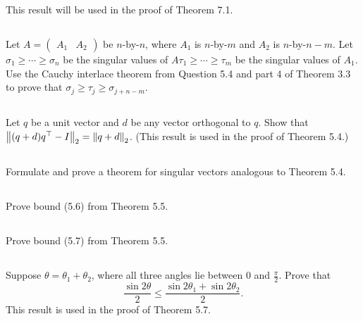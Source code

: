 \documentclass[a4paper]{ctexart}
\newcommand{\pf}{\textbf{\color{pink}{proof:}}}
\newcommand{\bymn}[2]{$#1$-by-$#2$}
\newcommand{\tmat}[2]{\begin{pmatrix}#1&#2\end{pmatrix}}
\begin{document}
This result will be used in the proof of Theorem 7.1.

\pf

\subsection{}
Let $A = \tmat{A_1}{A_2}$ be \bymn{n}{n}, where $A_1$ is \bymn{n}{m}
and $A_2$ is \bymn{n}{n-m}. Let $\sigma_1\ge\cdots\ge\sigma_n$ be the singular values of $A
\tau_1 \ge \cdots\ge \tau_m$ be the singular values of $A_1$. Use the Cauchy interlace theorem
from Question 5.4 and part 4 of Theorem 3.3 to prove that $\sigma_j \ge \tau_j \ge \sigma_{j+n-m}$.

\pf

\subsection{}
Let $q$ be a unit vector and $d$ be any vector orthogonal to $q$. 
Show that $\norm{(q + d)q^\top - I}_2 = \norm{q + d}_2$. (This result is used in the
proof of Theorem 5.4.)

\pf

\subsection{}
Formulate and prove a theorem for singular vectors
analogous to Theorem 5.4.

\pf

\subsection{}
Prove bound (5.6) from Theorem 5.5.

\pf

\subsection{}
Prove bound (5.7) from Theorem 5.5.

\pf

\subsection{}
Suppose $\theta = \theta_1 +\theta_2$, where all three angles lie between
$0$ and $\frac{\pi}{2}$. Prove that 
\begin{equation*}
    \frac{\sin 2\theta}{2} \le \frac{\sin 2\theta_1 + \sin 2\theta_2}{2}.
\end{equation*}
This result is used in the proof of Theorem 5.7.
\end{document}
